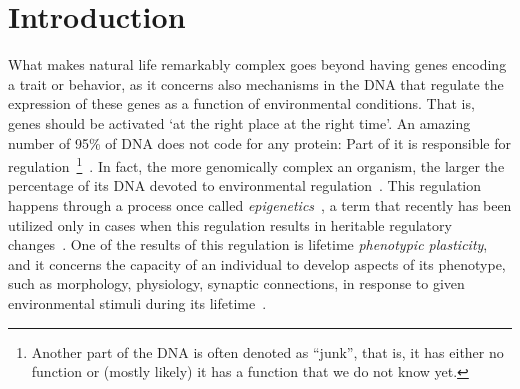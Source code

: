 \documentclass[utf8]{frontiersSCNS} %
\begin{document}
\section{Introduction}


What makes natural life remarkably complex goes beyond having genes encoding a trait or behavior, as it concerns also mechanisms in the DNA that regulate the expression of these genes as a function of environmental conditions. That is, genes should be activated `at the right place at the right time'. An amazing number of 95\% of DNA does not code for any protein: Part of it is responsible for regulation~\footnote{Another part of the DNA is often denoted as ``junk'', that is, it has either no function or (mostly likely) it has a function that we do not know yet.}~\citep{sapolsky2017behave}. In fact, the more genomically complex an organism, the larger the percentage of its DNA devoted to environmental regulation~\citep{sapolsky2017behave}. This regulation happens through a process once called \textit{epigenetics}~\citep{bossdorf2008epigenetics}, a term that recently has been utilized only in cases when this regulation results in heritable regulatory changes~\citep{sapolsky2017behave}. One of the results of this regulation is lifetime \textit{phenotypic plasticity}, and it concerns the capacity of an individual to develop aspects of its phenotype, such as morphology, physiology, synaptic connections, in response to given environmental stimuli during its lifetime~\citep{fusco2010phenotypic}. 
\end{document}
